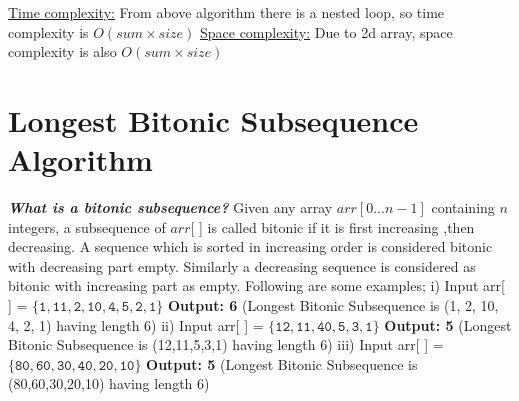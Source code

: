 \documentclass[12pt]{book}
\begin{document}
\underline{Time complexity:}\newline
From above algorithm there is a nested loop, so time complexity is $O(sum \times size)$
\newline\newline
\underline{Space complexity:}\newline
Due to 2d array, space complexity is also $O(sum \times size)$\newline

\chapter{Longest Bitonic Subsequence Algorithm}

\textbf{\textit{What is a bitonic subsequence?}}\newline
Given any array $arr[0...n-1]$ containing $n$ integers, a subsequence of $arr$[ ] is called bitonic if it is first increasing ,then decreasing.\newline
A sequence which is sorted in increasing order is considered bitonic with decreasing part empty. Similarly a decreasing sequence is considered as bitonic with increasing part as empty.\newline\newline
Following are some examples;\newline\newline
i) Input arr[ ] = $\mathtt{\{1, 11, 2, 10, 4, 5, 2, 1\}}$\newline
   \textbf{Output: 6}\newline
   (Longest Bitonic Subsequence is (1, 2, 10, 4, 2, 1) having length 6)\newline\newline
ii) Input arr[ ] = $\mathtt{\{12, 11, 40, 5, 3, 1\}}$\newline
   \textbf{Output: 5}\newline
   (Longest Bitonic Subsequence is (12,11,5,3,1) having length 6)\newline\newline
iii) Input arr[ ] = $\mathtt{\{80, 60, 30, 40, 20, 10\}}$\newline
   \textbf{Output: 5}\newline
   (Longest Bitonic Subsequence is (80,60,30,20,10) having length 6)\newline\newline
\end{document}

